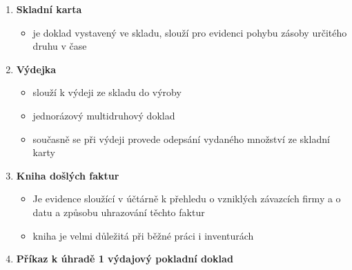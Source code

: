 \documentclass[11pt,a4paper,twoside]{book}
\begin{document}
\begin{enumerate}
\begin{itemize}
\begin{itemize}
					\end{itemize}
			\end{itemize}
		\item \textbf{Skladní karta}
			\begin{itemize}
				\item je doklad vystavený ve skladu, slouží pro evidenci pohybu zásoby určitého druhu v čase
			\end{itemize}
		\item \textbf{Výdejka}
			\begin{itemize}
				\item slouží k výdeji ze skladu do výroby
				\item jednorázový multidruhový doklad
				\item současně se při výdeji provede odepsání vydaného množství ze skladní karty
			\end{itemize}
		\item \textbf{Kniha došlých faktur}
			\begin{itemize}
				\item Je evidence sloužící v účtárně k přehledu o vzniklých závazcích firmy a o datu a způsobu uhrazování těchto faktur
				\item kniha je velmi důležitá při běžné práci i inventurách
			\end{itemize}
		\item \textbf{Příkaz k úhradě 1 výdajový pokladní doklad}
	\end{enumerate}
\end{document}
